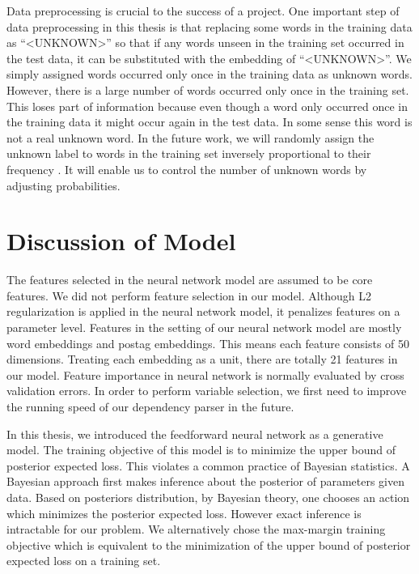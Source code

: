 Data preprocessing is crucial to the success of a project. One important step of data preprocessing in this thesis is that replacing some words in the training data as ``<UNKNOWN>'' so that if any words unseen in the training set occurred in the test data, it can be substituted with the embedding of ``<UNKNOWN>''. We simply assigned words occurred only once in the training data as unknown words. However, there is a large number of words occurred only once in the training set. This loses part of information because even though a word only occurred once in the training data it might occur again in the test data. In some sense this word is not a real unknown word. In the future work, we will randomly assign the unknown label to words in the training set inversely proportional to their frequency \cite{kiperwasser2016simple}. It will enable us to control the number of unknown words by adjusting probabilities.

\section{Discussion of Model}
The features selected in the neural network model are assumed to be core features. We did not perform feature selection in our model. Although L2 regularization is applied in the neural network model, it penalizes features on a parameter level. Features in the setting of our neural network model are mostly word embeddings and postag embeddings. This means each feature consists of 50 dimensions. Treating each embedding as a unit, there are totally 21 features in our model. Feature importance in neural network is normally evaluated by cross validation errors. In order to perform variable selection, we first need to improve the running speed of our dependency parser in the future.

In this thesis, we introduced the feedforward neural network as a generative model. The training objective of this model is to minimize the upper bound of posterior expected loss. This violates a common practice of Bayesian statistics. A Bayesian approach first makes inference about the posterior of parameters given data. Based on posteriors distribution, by Bayesian theory, one chooses an action which minimizes the posterior expected loss. However exact inference is intractable for our problem. We alternatively chose the max-margin training objective which is equivalent to the minimization of the upper bound of posterior expected loss on a training set.



